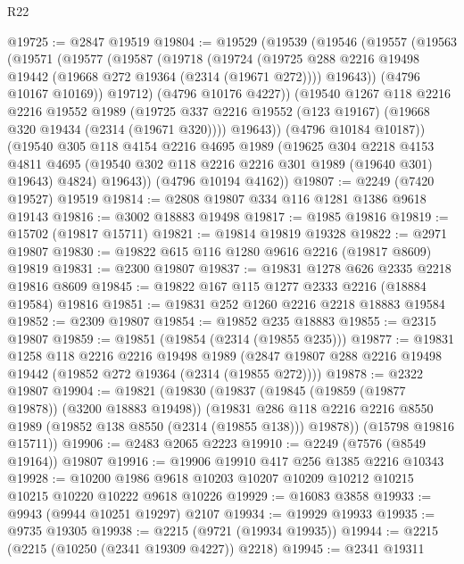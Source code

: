 \begin{lexlean}{R22}
\begin{coremodule}
@19725 := @2847 @19519
@19804 := @19529
    (@19539
      (@19546
        (@19557
          (@19563
            (@19571
              (@19577
                (@19587
                  (@19718
                    (@19724
                      (@19725 @288 @2216 @19498 @19442 (@19668 @272 @19364 (@2314 (@19671 @272))))
                      @19643))
                  (@4796 @10167 @10169))
                @19712)
              (@4796 @10176 @4227))
            (@19540
              @1267
              @118
              @2216
              @2216
              @19552
              @1989
              (@19725 @337 @2216 @19552 (@123 @19167) (@19668 @320 @19434 (@2314 (@19671 @320))))
              @19643))
          (@4796 @10184 @10187))
        (@19540
          @305
          @118
          @4154
          @2216
          @4695
          @1989
          (@19625
            @304
            @2218
            @4153
            @4811
            @4695
            (@19540 @302 @118 @2216 @2216 @301 @1989 (@19640 @301) @19643)
            @4824)
          @19643))
      (@4796 @10194 @4162))
@19807 := @2249 (@7420 @19527) @19519
@19814 := @2808 @19807 @334 @116 @1281 @1386 @9618 @19143
@19816 := @3002 @18883 @19498
@19817 := @1985 @19816
@19819 := @15702 (@19817 @15711)
@19821 := @19814 @19819 @19328
@19822 := @2971 @19807
@19830 := @19822 @615 @116 @1280 @9616 @2216 (@19817 @8609) @19819
@19831 := @2300 @19807
@19837 := @19831 @1278 @626 @2335 @2218 @19816 @8609
@19845 := @19822 @167 @115 @1277 @2333 @2216 (@18884 @19584) @19816
@19851 := @19831 @252 @1260 @2216 @2218 @18883 @19584
@19852 := @2309 @19807
@19854 := @19852 @235 @18883
@19855 := @2315 @19807
@19859 := @19851 (@19854 (@2314 (@19855 @235)))
@19877 := @19831
    @1258
    @118
    @2216
    @2216
    @19498
    @1989
    (@2847 @19807 @288 @2216 @19498 @19442 (@19852 @272 @19364 (@2314 (@19855 @272))))
@19878 := @2322 @19807
@19904 := @19821
    (@19830
      (@19837
        (@19845 (@19859 (@19877 @19878)) (@3200 @18883 @19498))
        (@19831 @286 @118 @2216 @2216 @8550 @1989 (@19852 @138 @8550 (@2314 (@19855 @138))) @19878))
      (@15798 @19816 @15711))
@19906 := @2483 @2065 @2223
@19910 := @2249 (@7576 (@8549 @19164)) @19807
@19916 := @19906 @19910 @417 @256 @1385 @2216 @10343
@19928 := @10200 @1986 @9618 @10203 @10207 @10209 @10212 @10215 @10215 @10220 @10222 @9618 @10226
@19929 := @16083 @3858
@19933 := @9943 (@9944 @10251 @19297) @2107
@19934 := @19929 @19933
@19935 := @9735 @19305
@19938 := @2215 (@9721 (@19934 @19935))
@19944 := @2215 (@2215 (@10250 (@2341 @19309 @4227)) @2218)
@19945 := @2341 @19311

\end{coremodule}
\end{lexlean}

